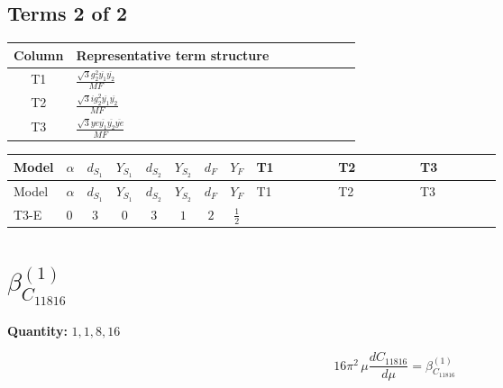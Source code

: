 \documentclass[8pt]{article}
\begin{document}
\begin{landscape}
\subsection*{Terms 2 of 2}
\begin{center}
\begin{tabular}{@{}c >{\raggedright\arraybackslash}p{0.82\linewidth}@{}}
\toprule
Column & Representative term structure \\
\midrule
T1 & \(\displaystyle \frac{\sqrt{3} g_{2}^{2} \overline{y_{1}} \overline{y_{2}}}{MF}\) \\
\midrule
T2 & \(\displaystyle \frac{\sqrt{3} i g_{2}^{2} \overline{y_{1}} \overline{y_{2}}}{MF}\) \\
\midrule
T3 & \(\displaystyle \frac{\sqrt{3} ye \overline{y_{1}} \overline{y_{2}} \overline{ye}}{MF}\) \\
\midrule
\bottomrule
\end{tabular}
\end{center}
\smallskip
\tiny
\begin{longtable}{@{}llcccccc >{\raggedright\arraybackslash}p{0.21\linewidth} >{\raggedright\arraybackslash}p{0.21\linewidth} >{\raggedright\arraybackslash}p{0.21\linewidth}@{}}
\toprule
Model & $\alpha$ & $d_{S_1}$ & $Y_{S_1}$ & $d_{S_2}$ & $Y_{S_2}$ & $d_F$ & $Y_F$ & T1 & T2 & T3 \\
\midrule
\endfirsthead
\toprule
Model & $\alpha$ & $d_{S_1}$ & $Y_{S_1}$ & $d_{S_2}$ & $Y_{S_2}$ & $d_F$ & $Y_F$ & T1 & T2 & T3 \\
\midrule
\endhead
T3-E & $0$ & $3$ & $0$ & $3$ & $1$ & $2$ & $\frac{1}{2}$ & \scriptsize\adjustbox{max width=\linewidth}{$\begin{gathered} \frac{11 \sqrt{3} g_{2}^{2} \overline{y_{1}} \overline{y_{2}}}{8 MF}\end{gathered}$} & \scriptsize\adjustbox{max width=\linewidth}{$\begin{gathered} - \frac{\sqrt{3} i g_{2}^{2} \overline{y_{1}} \overline{y_{2}}}{6 MF}\end{gathered}$} & \scriptsize\adjustbox{max width=\linewidth}{$\begin{gathered} - \frac{\sqrt{3} ye \overline{y_{1}} \overline{y_{2}} \overline{ye}}{12 MF}\end{gathered}$} \\
\midrule
\bottomrule
\end{longtable}
\clearpage
\section*{$\beta_{C_{11816}}^{(1)}$}
\noindent\textbf{Quantity: }$\mathrm{1,1,8,16}$\par\smallskip
\[16\pi^2\,\mu\frac{d C_{11816}}{d\mu}=\beta_{C_{11816}}^{(1)}\]

\end{landscape}
\end{document}
